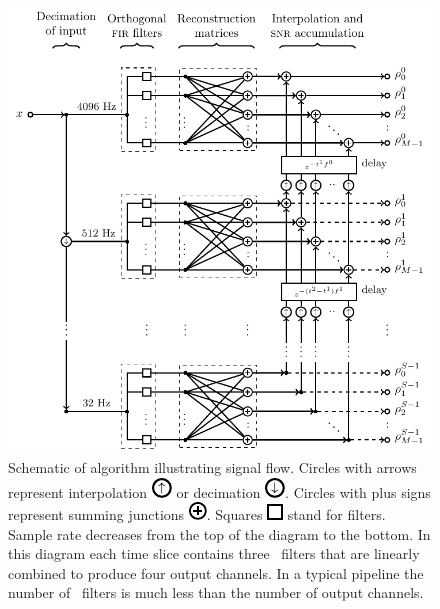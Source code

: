 \documentclass[portrait,plainboxedsections]{sciposter}
\begin{document}
\begin{minipage}[t]{0.4\textwidth}

\begin{figure}[h!]
	\begin{center}
		\includegraphics[width=\textwidth]{figures/lloid-diagram}
		\caption{\label{fig:pipeline} Schematic of \lloid{} algorithm illustrating
signal flow.  Circles with arrows represent interpolation
\protect\includegraphics[scale=3]{figures/upsample-symbol} or decimation
\protect\includegraphics[scale=3]{figures/downsample-symbol}.  Circles with plus
signs represent summing junctions
\protect\includegraphics[scale=3]{figures/adder-symbol}.  Squares
\protect\includegraphics[scale=3]{figures/fir-symbol} stand for \fir{} filters.  Sample
rate decreases from the top of the diagram to the bottom.  In this diagram each
time slice contains three \fir\ filters that are linearly combined to produce
four output channels.  In a typical pipeline the number of \fir\ filters is
much less than the number of output channels.}
	\end{center}
\end{figure}


\end{minipage}
\end{document}
